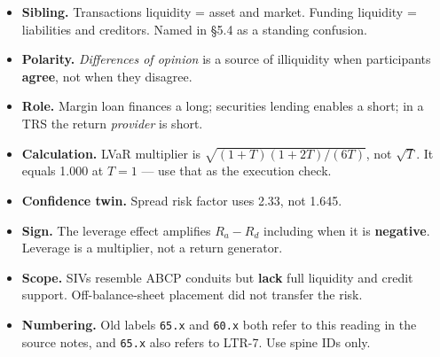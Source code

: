 \begin{lrtrapbox}
\begin{itemize}
\item \textbf{Sibling.} Transactions liquidity = asset and market. Funding liquidity = liabilities and creditors. Named in \S5.4 as a standing confusion.
\item \textbf{Polarity.} \emph{Differences of opinion} is a source of illiquidity when participants \textbf{agree}, not when they disagree.
\item \textbf{Role.} Margin loan finances a long; securities lending enables a short; in a TRS the return \emph{provider} is short.
\item \textbf{Calculation.} LVaR multiplier is $\sqrt{(1+T)(1+2T)/(6T)}$, not $\sqrt{T}$. It equals 1.000 at $T=1$ — use that as the execution check.
\item \textbf{Confidence twin.} Spread risk factor uses 2.33, not 1.645.
\item \textbf{Sign.} The leverage effect amplifies $R_a - R_d$ including when it is \textbf{negative}. Leverage is a multiplier, not a return generator.
\item \textbf{Scope.} SIVs resemble ABCP conduits but \textbf{lack} full liquidity and credit support. Off-balance-sheet placement did not transfer the risk.
\item \textbf{Numbering.} Old labels \texttt{65.x} and \texttt{60.x} both refer to this reading in the source notes, and \texttt{65.x} also refers to LTR-7. Use spine IDs only.
\end{itemize}
\end{lrtrapbox}
